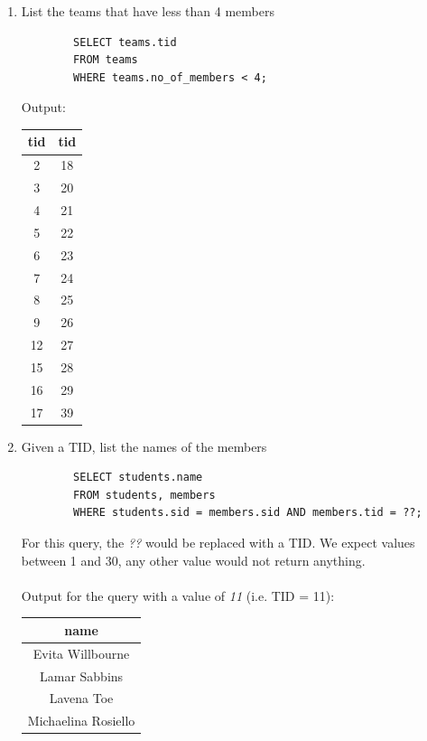 \documentclass[11pt,letterpaper]{article}
\begin{document}
\begin{enumerate}
		\item List the teams that have less than 4 members
		
		\begin{verbatim}
		SELECT teams.tid 
		FROM teams 
		WHERE teams.no_of_members < 4;
		\end{verbatim}
		Output:
		\begin{center}
			\begin{tabular}{ | c | c | }
				\hline
				tid & tid \\
				\hline
				2 & 18 \\
				3 & 20 \\
				4 & 21 \\
				5 & 22 \\
				6 & 23 \\
				7 & 24 \\
				8 & 25 \\
				9 & 26 \\
				12 & 27 \\
				15 & 28 \\
				16 & 29 \\
				17 & 39 \\
				\hline
			\end{tabular}
		\end{center}
		
		\item Given a TID, list the names of the members
		
		\begin{verbatim}
		SELECT students.name 
		FROM students, members 
		WHERE students.sid = members.sid AND members.tid = ??;
		\end{verbatim}
		For this query, the \textit{??} would be replaced with a TID. We expect values between 1 and 30, any other value would not return anything.\\
		\\
		Output for the query with a value of \textit{11} (i.e. TID = 11):
		\begin{center}
			\begin{tabular}{ | c | }
				\hline
				name \\
				\hline
				Evita Willbourne \\
				Lamar Sabbins \\
				Lavena Toe \\
				Michaelina Rosiello \\
				\hline
			\end{tabular}
		\end{center}
		

\end{enumerate}
\end{document}

